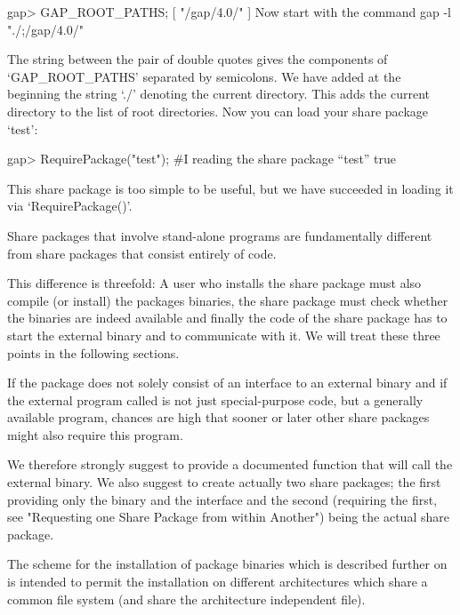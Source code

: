 \begintt
gap> GAP_ROOT_PATHS;
[ "/gap/4.0/" ]
\endtt
Now start {\GAP} with the command 
\begintt
gap -l "./;/gap/4.0/"
\endtt

The string between the pair of double quotes gives the components of
`GAP_ROOT_PATHS' separated by semicolons. We have added at the beginning
the string `./' denoting the current directory. This adds the current
directory to the list of {\GAP} root directories.  Now you can load your
share package `test':

\begintt
gap> RequirePackage("test");
#I reading the share package ``test''
true
\endtt

This share package is too simple to be useful, but we have succeeded in
loading it via `RequirePackage()'.


Share packages that  involve stand-alone programs are fundamentally
different from share packages that consist entirely of {\GAP} code.

This difference is threefold: A  user who installs the share package
must also  compile (or install) the packages  binaries, the share
package must  check whether the binaries  are indeed available and
finally the {\GAP} code of the share package has to start the external
binary and to communicate with it. We will treat these three points in
the following sections.

If the package does not solely consist of an interface to an external
binary and if the external program called is not just special-purpose
code, but a generally available program, chances are high that sooner
or later other share packages might also require this program.

We therefore strongly suggest to provide a documented {\GAP} function
that will call the external binary. We also suggest to create actually
two share  packages; the first providing only the binary and the
interface and the second (requiring the first, see "Requesting one
Share Package from within Another") being the actual share package.


The scheme for the installation of package binaries which is described
further on is intended to permit  the installation on different
architectures which  share a common file  system (and share the
architecture independent file).

